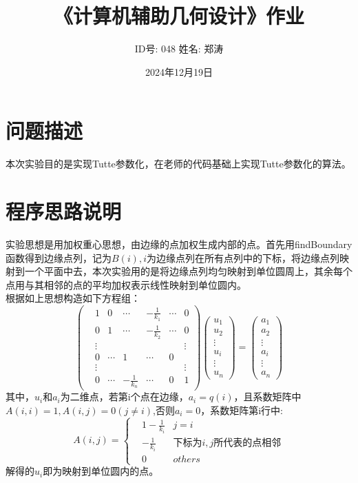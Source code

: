 \documentclass{article}
\begin{document}
	
	\title{《计算机辅助几何设计》作业}
	\author{ID号: 048  \qquad  姓名: 郑涛}  %
	\date{2024年12月19日}
	\maketitle
	\section{问题描述}
	本次实验目的是实现Tutte参数化，在老师的代码基础上实现Tutte参数化的算法。
	\section{程序思路说明}
	实验思想是用加权重心思想，由边缘的点加权生成内部的点。首先用findBoundary函数得到边缘点列，记为$B(i),i$为边缘点列在所有点列中的下标，将边缘点列映射到一个平面中去，本次实验用的是将边缘点列均匀映射到单位圆周上，其余每个点用与其相邻的点的平均加权表示线性映射到单位圆内。\\
	根据如上思想构造如下方程组：
	\begin{equation*}
		\begin{pmatrix}
			&1 &0 &\dotsb &-\frac{1}{k_{1}} &\dotsb  &0\\
			&0 &1 &\dotsb &-\frac{1}{k_{2}} &\dotsb  &0\\
			&\vdots & & & &  &\vdots \\
			&0 &\dotsb &1 &\dotsb  &0& \\
			&\vdots & & & &  &\vdots \\
			&0 &\dotsb &-\frac{1}{k_{n}} &\dotsb  &0& 1
		\end{pmatrix}
		\begin{pmatrix}
			u_{1}\\
			u_{2}\\
			\vdots\\
			u_{i}\\
			\vdots\\
			u_{n}
		\end{pmatrix}
		=
		\begin{pmatrix}
			a_{1}\\
			a_{2}\\
			\vdots\\
			a_{i}\\
			\vdots\\
			a_{n}
		\end{pmatrix}
	\end{equation*}
	其中，$u_{i}$和$a_{i}$为二维点，若第i个点在边缘，$a_{i}=q(i)$，且系数矩阵中$A(i,i)=1,A(i,j)=0(j\neq i)$,否则$a_{i}=0$，系数矩阵第i行中:
	$$
	A(i,j)=
	\left\{
	\begin{matrix}
		&1-\frac{1}{k_{i}}  &j=i\\
		&-\frac{1}{k_{i}}   &\mbox{下标为}i,j\mbox{所代表的点相邻}\\
		&0                  &others
	\end{matrix}
	\right .
	$$
	解得的$u_{i}$即为映射到单位圆内的点。
\end{document}
